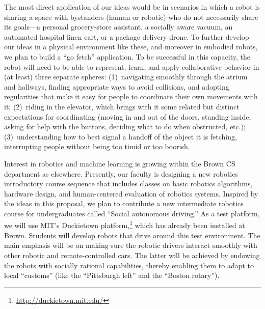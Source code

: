 The most direct application of our ideas would be in scenarios in
which a robot is sharing a space with bystanders (human or robotic)
who do not necessarily share its goals---a personal grocery-store
assistant, a socially aware vacuum, an automated hospital linen cart, or
a package delivery drone.  To further develop our ideas in a physical
environment like these, and moreover in embodied robots,
we plan to build a ``go fetch'' application.
To be successful in this capacity, the robot will need to be able to
represent, learn, and apply collaborative behavior in (at least) three
separate spheres:
%
(1)~navigating smoothly through the atrium and hallways, finding
  appropriate ways to avoid collisions, and adopting regularities that
  make it easy for people to coordinate their own movements with it;
%
(2)~riding in the elevator, which brings with it some related but
  distinct expectations for coordinating (moving in and out of the
  doors, standing inside, asking for help with the buttons, deciding
  what to do when obstructed, etc.);
%
(3)~understanding how to best signal a handoff of the object it is
  fetching, interrupting people without being too timid or too
  boorish.
%

Interest in robotics and machine learning is growing within the Brown
CS department as elsewhere.  Presently, our faculty is designing a new
robotics introductory course sequence that includes classes on basic
robotics algorithms, hardware design, and human-centered evaluation of
robotics systems.  Inspired by the ideas in this proposal, we plan to
contribute a new intermediate robotics course for undergraduates
called ``Social autonomous driving.''  As a test platform, we will use
MIT's Duckietown platform,\footnote{\url{http://duckietown.mit.edu/}}
which has already been installed at Brown.  Students will develop
robots that drive around this test environment.  The main emphasis
will be on making sure the robotic drivers interact smoothly with
other robotic and remote-controlled cars.  The latter will be achieved
by endowing the robots with socially rational capabilities, thereby
enabling them to adapt to local ``customs'' 
(like the ``Pittsburgh left'' and the ``Boston rotary'').

